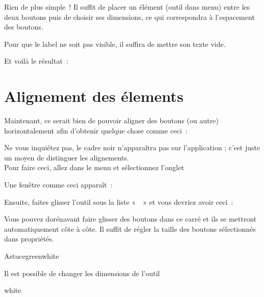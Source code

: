 Rien de plus simple ! Il suffit de placer un élément 
(outil dans menu) entre les deux boutons puis de
choisir ses dimensions, ce qui correspondra à l'espacement des boutons. \\

Pour que le label ne soit pas visible, il suffira de mettre son texte vide.


Et voilà le résultat : 



\section{Alignement des élements}

Maintenant, ce serait bien de pouvoir aligner des boutons (ou autre)
horizontalement afin d'obtenir quelque  chose comme ceci :


Ne vous inquiétez pas, le cadre noir n’apparaîtra pas sur l'application ; c'est juste un moyen de distinguer les alignements. \\

Pour faire ceci, allez dans le {\color{orange} menu} et sélectionnez l'onglet 


Une fenêtre comme ceci apparaît :


Ensuite, faites glisser l'outil 
sous la liste «  » et vous devriez avoir ceci :


Vous pouvez dorénavant faire glisser des boutons dans ce carré et ils se mettront automatiquement côte à côte. Il suffit de régler la taille des boutons sélectionnés dans {\color{green}propriétés}.


\begin{messageBox}{Astuce}{green}{white}{

Il est possible de changer les dimensions de l'outil 
}{white}
\end{messageBox}


